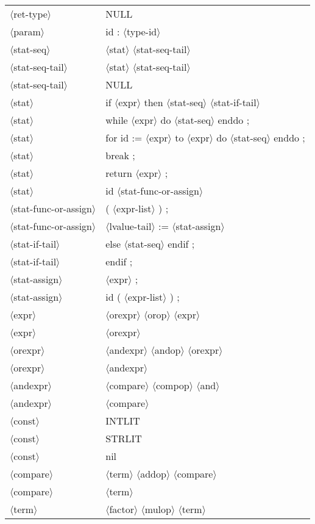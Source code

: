 \documentclass[11pt, fleqn]{article}
\newcommand{\atag}[1]{$\langle$#1$\rangle$}
\begin{document}
\begin{longtable}{l|l}
\atag{ret-type}					&	NULL		\\
\atag{param}						&	id : \atag{type-id}		\\
\atag{stat-seq}					&	\atag{stat} \atag{stat-seq-tail}		\\
\atag{stat-seq-tail}				&	\atag{stat} \atag{stat-seq-tail}		\\
\atag{stat-seq-tail}				&	NULL		\\
\atag{stat}						&	if \atag{expr} then \atag{stat-seq} \atag{stat-if-tail}		\\
\atag{stat}						&	while \atag{expr} do \atag{stat-seq} enddo ;		\\
\atag{stat}						&	for id := \atag{expr} to \atag{expr} do \atag{stat-seq} enddo ;		\\
\atag{stat}						&	break ;		\\
\atag{stat}						&	return \atag{expr} ;		\\
\atag{stat}						&	id \atag{stat-func-or-assign}	\\
\atag{stat-func-or-assign}		&	( \atag{expr-list} ) ;	\\
\atag{stat-func-or-assign}		&	\atag{lvalue-tail} := \atag{stat-assign}	\\
\atag{stat-if-tail}				&	else \atag{stat-seq} endif ;		\\
\atag{stat-if-tail}				&	endif ;		\\
\atag{stat-assign}				&	\atag{expr}	;	\\
\atag{stat-assign}				&	id ( \atag{expr-list} ) ;	\\
\atag{expr}						&	\atag{orexpr} \atag{orop} \atag{expr}		\\
\atag{expr}						&	\atag{orexpr}		\\
\atag{orexpr} 					&	\atag{andexpr} \atag{andop} \atag{orexpr}		\\
\atag{orexpr} 					&	\atag{andexpr}		\\
\atag{andexpr} 					&	\atag{compare} \atag{compop} \atag{and}		\\
\atag{andexpr} 					&	\atag{compare}		\\
\atag{const}						&	INTLIT		\\
\atag{const}						&	STRLIT		\\
\atag{const}						&	nil		\\
\atag{compare}					&	\atag{term} \atag{addop} \atag{compare}		\\
\atag{compare}					&	\atag{term}		\\
\atag{term}						&	\atag{factor} \atag{mulop} \atag{term}		\\

\end{longtable}
\end{document}
